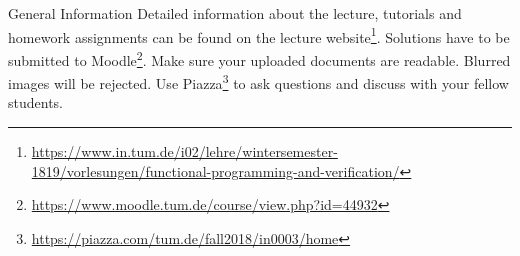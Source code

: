 \documentclass[
  english
]{tumteaching}
\begin{document}
\verticalline
\begin{disclaimer}{General Information}
	Detailed information about the lecture, tutorials and homework assignments can be found on the lecture website\footnote{\url{https://www.in.tum.de/i02/lehre/wintersemester-1819/vorlesungen/functional-programming-and-verification/}}. Solutions have to be submitted to Moodle\footnote{\url{https://www.moodle.tum.de/course/view.php?id=44932}}. Make sure your uploaded documents are readable. Blurred images will be rejected. Use Piazza\footnote{\url{https://piazza.com/tum.de/fall2018/in0003/home}} to ask questions and discuss with your fellow students.
\end{disclaimer}



\verticalline


\end{document}

